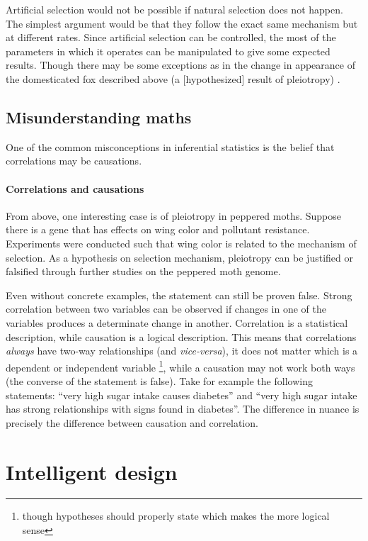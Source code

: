 Artificial selection would not be possible if natural selection does not happen.
The simplest argument would be that they follow the exact same mechanism but at different rates.
Since artificial selection can be controlled, the most of the parameters in which it operates can be manipulated to give some expected results.
Though there may be some exceptions as in the change in appearance of the domesticated fox described above (a [hypothesized] result of pleiotropy) \cite{biomain}.

\subsection{Misunderstanding maths}
One of the common misconceptions in inferential statistics is the belief that correlations may be causations.

\paragraph{Correlations and causations}
From above, one interesting case is of pleiotropy in peppered moths.
Suppose there is a gene that has effects on wing color and pollutant resistance.
Experiments were conducted such that wing color is related to the mechanism of selection.
As a hypothesis on selection mechanism, pleiotropy can be justified or falsified through further studies on the peppered moth genome.

Even without concrete examples, the statement can still be proven false.
Strong correlation between two variables can be observed if changes in one of the variables produces a determinate change in another.
Correlation is a statistical description, while causation is a logical description.
This means that correlations \emph{always} have two-way relationships (and \textit{vice-versa}), it does not matter which is a dependent or independent variable
\footnote{though hypotheses should properly state which makes the more logical sense}, while
a causation may not work both ways (the converse of the statement is false).
Take for example the following statements: ``very high sugar intake causes diabetes'' and ``very high sugar intake has strong relationships with signs found in diabetes''.
The difference in nuance is precisely the difference between causation and correlation.


\section{Intelligent design}
